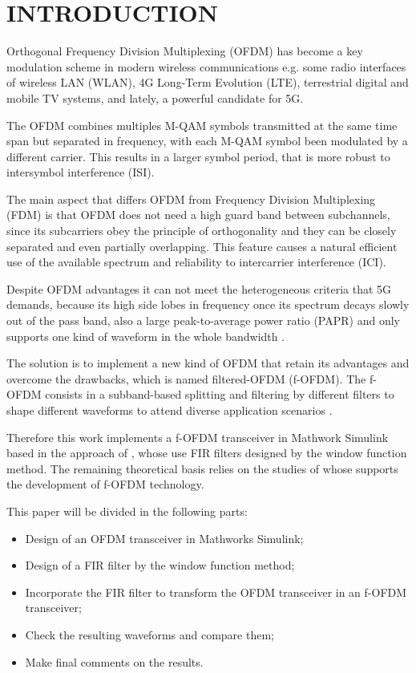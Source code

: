 \section{INTRODUCTION}

Orthogonal Frequency Division Multiplexing (OFDM) has become a key modulation scheme in modern wireless communications e.g. some radio interfaces of wireless LAN (WLAN), 4G Long-Term Evolution (LTE), terrestrial digital and mobile TV systems, and lately, a powerful candidate for 5G.

The OFDM combines multiples M-QAM symbols transmitted at the same time span but separated in frequency, with each M-QAM symbol been modulated by a different carrier. This results in a larger symbol period, that is more robust to intersymbol interference (ISI).

The main aspect that differs OFDM from Frequency Division Multiplexing (FDM) is that OFDM does not need a high guard band between subchannels, since its subcarriers obey the principle of orthogonality and they can be closely separated and even partially overlapping. This feature causes a natural efficient use of the available spectrum and reliability to intercarrier interference (ICI).

Despite OFDM advantages it can not meet the heterogeneous criteria that 5G demands, because its high side lobes in frequency once its spectrum decays slowly out of the pass band, also a large peak-to-average power ratio (PAPR) and only supports one kind of waveform in the whole bandwidth \cite{abdoli2015filtered, cheng2016filtered}. 

The solution is to implement a new kind of OFDM that retain its advantages and overcome the drawbacks, which is named filtered-OFDM (f-OFDM). The f-OFDM consists in a subband-based splitting and filtering by different filters to shape different waveforms to attend diverse application scenarios \cite{cheng2016filtered, zhang2015filtered, zhang2017filtered}.

Therefore this work implements a f-OFDM transceiver in Mathwork Simulink based in the approach of \cite{cheng2016filtered}, whose use FIR filters designed by the window function method. The remaining theoretical basis relies on the studies of \cite{ abdoli2015filtered, zhang2015filtered, zhang2017filtered, de2019comparing, al2020improving} whose supports the development of f-OFDM technology.

This paper will be divided in the following parts:

\begin{itemize}
    \item Design of an OFDM transceiver in Mathworks Simulink;
    \item Design of a FIR filter by the window function method;
    \item Incorporate the FIR filter to transform the OFDM transceiver in an f-OFDM transceiver;
    \item Check the resulting waveforms and compare them;
    \item Make final comments on the results.
\end{itemize}